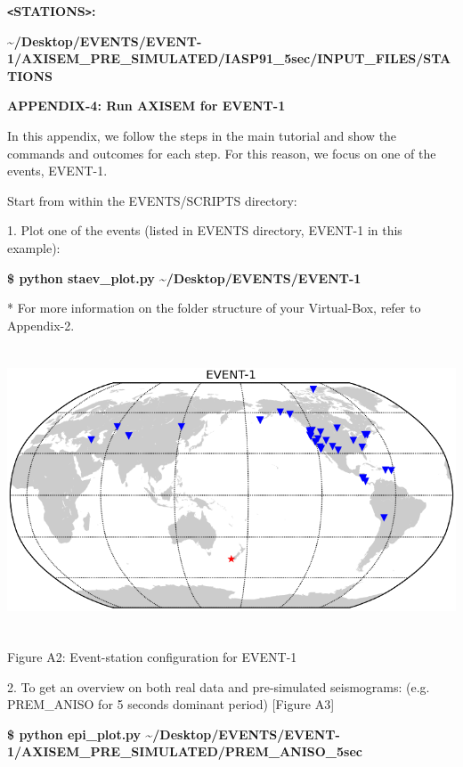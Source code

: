 \documentclass{article}
\begin{document}
\textbf{\texttt{<}STATIONS\texttt{>}:}

\textbf{\textasciitilde{}/Desktop/EVENTS/EVENT-1/AXISEM\_PRE\_SIMULATED/IASP91\_5sec/INPUT\_FILES/STATIONS}

{\large{}\textbf{APPENDIX-4: Run AXISEM for EVENT-1}}

In this appendix, we follow the steps in the main tutorial and show the commands 
and outcomes for each step. For this reason, we focus on one of the events, EVENT-1.

Start from within the EVENTS/SCRIPTS directory:

1. Plot one of the events (listed in EVENTS directory, EVENT-1 in this example):

\textbf{\$ python staev\_plot.py \textasciitilde{}/Desktop/EVENTS/EVENT-1}

* For more information on the folder structure of your Virtual-Box, refer to Appendix-2.

\begin{center}
\includegraphics[width=444pt, height=240pt, keepaspectratio=true]{AXISEMTutorial-fig006.png}

{\small{}Figure A2: Event-station configuration for EVENT-1}
\end{center}

\baselineskip=13pt
\leftskip=0pt
2. To get an overview on both real data and pre-simulated seismograms: (e.g. PREM\_ANISO 
for 5 seconds dominant period) [Figure A3]

\textbf{\$ python epi\_plot.py \textasciitilde{}/Desktop/EVENTS/EVENT-1/AXISEM\_PRE\_SIMULATED/PREM\_ANISO\_5sec}
\end{document}
